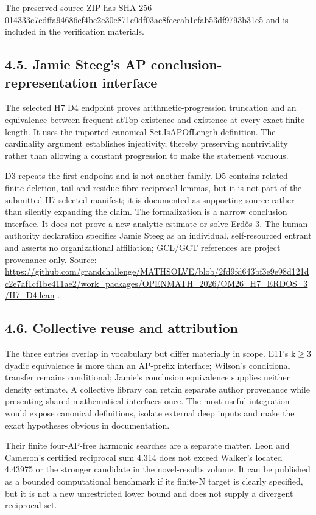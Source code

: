 \documentclass[11pt,a4paper]{article}
\begin{document}
\begin{samepage}
The preserved source ZIP has SHA-256 014333c7edffa94686ef4be2e30e871c0df03ac8feceab1efab53df9793b31e5 and is included in the verification materials.

\end{samepage}
\subsection{4.5. Jamie Steeg's AP conclusion-representation interface}
The selected H7 D4 endpoint proves arithmetic-progression truncation and an equivalence between frequent-atTop existence and existence at every exact finite length. It uses the imported canonical Set.IsAPOfLength definition. The cardinality argument establishes injectivity, thereby preserving nontriviality rather than allowing a constant progression to make the statement vacuous.

D3 repeats the first endpoint and is not another family. D5 contains related finite-deletion, tail and residue-fibre reciprocal lemmas, but it is not part of the submitted H7 selected manifest; it is documented as supporting source rather than silently expanding the claim. The formalization is a narrow conclusion interface. It does not prove a new analytic estimate or solve Erdős 3. The human authority declaration specifies Jamie Steeg as an individual, self-resourced entrant and asserts no organizational affiliation; GCL/GCT references are project provenance only. Source: \url{https://github.com/grandchallenge/MATHSOLVE/blob/2fd9fd643bf3e9e98d121dc2e7af1cf1be411ae2/work_packages/OPENMATH_2026/OM26_H7_ERDOS_3/H7_D4.lean} .

\subsection{4.6. Collective reuse and attribution}
The three entries overlap in vocabulary but differ materially in scope. E11's k\ensuremath{\geq}3 dyadic equivalence is more than an AP-prefix interface; Wilson's conditional transfer remains conditional; Jamie's conclusion equivalence supplies neither density estimate. A collective library can retain separate author provenance while presenting shared mathematical interfaces once. The most useful integration would expose canonical definitions, isolate external deep inputs and make the exact hypotheses obvious in documentation.

Their finite four-AP-free harmonic searches are a separate matter. Leon and Cameron's certified reciprocal sum 4.314 does not exceed Walker's located 4.43975 or the stronger candidate in the novel-results volume. It can be published as a bounded computational benchmark if its finite-N target is clearly specified, but it is not a new unrestricted lower bound and does not supply a divergent reciprocal set.
\end{document}
